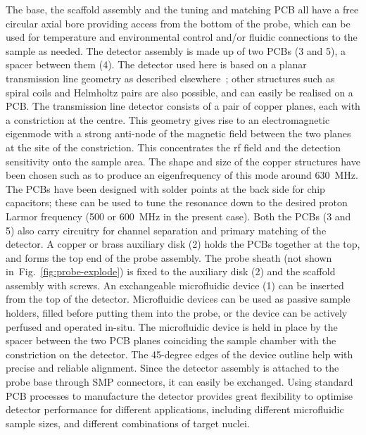 \documentclass[preprint,5p]{elsarticle}
\newcommand{\fig}[1]{Fig.~\ref{#1}}
\begin{document}
The base, the scaffold assembly and the tuning and matching PCB all have a free circular
axial bore providing access from the bottom of the probe, which can be used for
temperature and environmental control and/or fluidic connections to the sample as
needed. The detector assembly is made up of two PCBs (3 and 5), a spacer between them (4). The detector used here is based on a planar transmission line geometry as described elsewhere~\cite{gream_2016,stripline_jan}; other structures such as spiral
coils and Helmholtz pairs are also possible, and can easily be realised on a PCB.
The transmission line detector consists of a pair of copper
planes, each with a constriction at the centre.  This geometry gives rise to an
electromagnetic eigenmode with a strong anti-node of the magnetic field between
the two planes at the site of the constriction. This concentrates the rf field
and the detection sensitivity
onto the sample area.
The shape and size of the copper structures have been chosen such as to produce
an eigenfrequency of this mode around 630~MHz. The PCBs have been designed with
solder points at the back side for chip capacitors; these can be used to tune the
resonance down to the desired proton Larmor frequency (500 or 600~MHz in the present case).
Both the PCBs (3 and 5) also carry circuitry for channel separation and primary
matching of the detector. A copper or brass auxiliary disk (2) holds the PCBs
together at the top, and forms the top end of the probe assembly.
The probe sheath (not shown in~\fig{fig:probe-explode}) is fixed to the auxiliary disk (2)
and the scaffold assembly with screws.
An exchangeable microfluidic device (1) can be inserted from the top of the detector.
Microfluidic devices can be used as passive sample holders, filled before putting them
into the probe,
or the device can be actively perfused and operated in-situ.
The microfluidic device is held in place by the spacer
between the two PCB planes coinciding the sample chamber with the constriction on the
detector.  The 45-degree edges of the device outline help with precise and reliable
alignment.
Since the detector assembly is attached to the probe base through SMP
connectors, it can easily be exchanged.
Using standard PCB processes to manufacture the detector provides great flexibility
to optimise detector performance for different applications, including different
microfluidic sample sizes, and different combinations of target nuclei.
\end{document}
